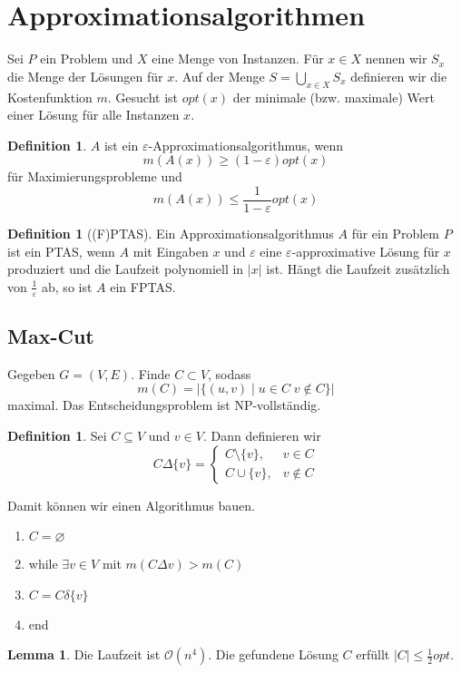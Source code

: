 \documentclass[a4paper, 12pt]{article}
\theoremstyle{plain}
\theoremstyle{definition}
\newtheorem{definition}[theorem]{Definition} %
\theoremstyle{lemma}
\newtheorem{lemma}[theorem]{Lemma}
\theoremstyle{remark}
\theoremstyle{corollary}
\theoremstyle{example}
\begin{document}
	\section{Approximationsalgorithmen}
	Sei $P$ ein Problem und $X$ eine Menge von Instanzen. Für $x \in X$ nennen wir $S_x$ die Menge der Lösungen für $x$. Auf der Menge $S = \bigcup_{x \in X} S_x$ definieren wir die Kostenfunktion $m$. Gesucht ist $opt(x)$ der minimale (bzw. maximale) Wert einer Lösung für alle Instanzen $x$.
	\begin{definition}
		$A$ ist ein $\varepsilon$-Approximationsalgorithmus, wenn \[m(A(x)) \geq (1-\varepsilon) opt(x)\] für Maximierungsprobleme und \[m(A(x)) \leq \frac{1}{1-\varepsilon} opt(x)\]
	\end{definition}
	\begin{definition}[(F)PTAS]
		Ein Approximationsalgorithmus $A$ für ein Problem $P$ ist ein PTAS, wenn $A$ mit Eingaben $x$ und $\varepsilon$ eine $\varepsilon$-approximative Lösung für $x$ produziert und die Laufzeit polynomiell in $\left|x\right|$ ist. Hängt die Laufzeit zusätzlich von $\frac{1}{\varepsilon}$ ab, so ist $A$ ein FPTAS.
	\end{definition}
	\subsection{Max-Cut}
	Gegeben $G=(V,E)$. Finde $C\subset V$, sodass \[m(C) = \left|\{(u,v) \mid u \in C \; v \notin C\}\right|\] maximal. Das Entscheidungsproblem ist NP-vollständig.
	\begin{definition}
		Sei $C\subseteq V$ und $v \in V$. Dann definieren wir \[C\Delta \{v\} = \begin{cases}
			C \setminus \{v\}, & v \in C\\
			C \cup \{v\}, & v \notin C
		\end{cases}\]
	\end{definition}
	Damit können wir einen Algorithmus bauen.
	\begin{enumerate}
		\item $C = \varnothing$
		\item while $\exists v \in V$ mit $m(C\Delta v) > m(C)$
		\item $C = C\delta \{v\}$
		\item end
	\end{enumerate}
	\begin{lemma}
		Die Laufzeit ist $\mathcal{O}(n^4)$. Die gefundene Lösung $C$ erfüllt $\left|C\right| \leq \frac{1}{2}opt$. 
	\end{lemma}
\end{document}
